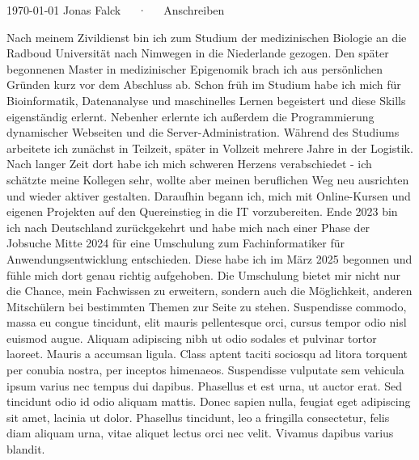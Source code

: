 \documentclass[11pt, a4paper]{awesome-cv}
\begin{document}
\makecvheader[R]

\makecvfooter
  {\today}
  {Jonas Falck~~~·~~~Anschreiben}
  {}

\makelettertitle

\begin{cvletter}

Nach meinem Zivildienst bin ich zum Studium der medizinischen Biologie an die Radboud Universität nach Nimwegen in die Niederlande gezogen. 
Den später begonnenen Master in medizinischer Epigenomik brach ich aus persönlichen Gründen kurz vor dem Abschluss ab. 
Schon früh im Studium habe ich mich für Bioinformatik, Datenanalyse und maschinelles Lernen begeistert und diese Skills eigenständig erlernt.
Nebenher erlernte ich außerdem die Programmierung dynamischer Webseiten und die Server-Administration.
Während des Studiums arbeitete ich zunächst in Teilzeit, später in Vollzeit mehrere Jahre in der Logistik. 
Nach langer Zeit dort habe ich mich schweren Herzens verabschiedet - ich schätzte meine Kollegen sehr, wollte aber meinen beruflichen Weg neu ausrichten und wieder aktiver gestalten.
Daraufhin begann ich, mich mit Online-Kursen und eigenen Projekten auf den Quereinstieg in die IT vorzubereiten. 
Ende 2023 bin ich nach Deutschland zurückgekehrt und habe mich nach einer Phase der Jobsuche Mitte 2024 für eine Umschulung zum Fachinformatiker für Anwendungsentwicklung entschieden. 
Diese habe ich im März 2025 begonnen und fühle mich dort genau richtig aufgehoben.
Die Umschulung bietet mir nicht nur die Chance, mein Fachwissen zu erweitern, sondern auch die Möglichkeit, anderen Mitschülern bei bestimmten Themen zur Seite zu stehen.
Suspendisse commodo, massa eu congue tincidunt, elit mauris pellentesque orci, cursus tempor odio nisl euismod augue. Aliquam adipiscing nibh ut odio sodales et pulvinar tortor laoreet. Mauris a accumsan ligula. Class aptent taciti sociosqu ad litora torquent per conubia nostra, per inceptos himenaeos. Suspendisse vulputate sem vehicula ipsum varius nec tempus dui dapibus. Phasellus et est urna, ut auctor erat. Sed tincidunt odio id odio aliquam mattis. Donec sapien nulla, feugiat eget adipiscing sit amet, lacinia ut dolor. Phasellus tincidunt, leo a fringilla consectetur, felis diam aliquam urna, vitae aliquet lectus orci nec velit. Vivamus dapibus varius blandit.


\end{cvletter}
\end{document}
